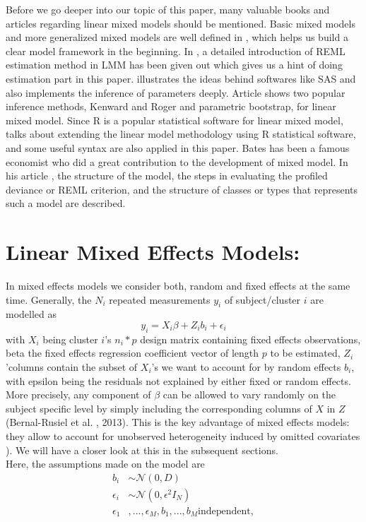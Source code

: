 \documentclass[a4paper,11pt]{article}
\begin{document}
	Before we go deeper into our topic of this paper, many valuable books and articles regarding linear mixed models should be mentioned. Basic mixed models and more generalized mixed models are well defined in \cite{Fahrmeir}, which helps us build a clear model framework in the beginning. In \cite{Tutorial}, a detailed introduction of REML estimation method in LMM has been given out which gives us a hint of doing estimation part in this paper. \cite{Verbeke} illustrates the ideas behind softwares like SAS and also implements the inference of parameters deeply. Article \cite{KR} shows two popular inference methods, Kenward and Roger and parametric bootstrap, for linear mixed model. Since R is a popular statistical software for linear mixed model, \cite{Faraway} talks about extending the linear model methodology using R statistical software, and some useful syntax are also applied in this paper. Bates has been a famous economist who did a great contribution to the development of mixed model. In his article \cite{Bates}, the structure of the model, the steps in evaluating the profiled deviance or REML criterion, and the structure of classes or types that represents such a model are described.
	
\section{Linear Mixed Effects Models:}

In mixed effects models we consider both, random and fixed effects at the same time. Generally, the 
$N_i$ repeated measurements  $y_i$ of subject/cluster $i$ are modelled as
\begin{equation}
	y_i=X_i\beta + Z_ib_i +\epsilon_i
\end{equation}
with $X_i$ being cluster $i$’s $n_i*p$  design matrix containing fixed effects observations, beta the fixed effects regression coefficient vector of length $p$ to be estimated, $Z_i$’columns contain the subset of $X_i$’s we want to account for by random effects $b_i$, with epsilon being the residuals not explained by either fixed or random effects. More precisely, any component of $\beta$ can be allowed to vary randomly on the subject specific level by simply including the corresponding columns of $X$ in $Z$ (Bernal-Rusiel et al. , 2013). This is the key advantage of mixed effects models: they allow to account for unobserved heterogeneity induced by omitted covariates \cite{Fahrmeir}).
 We will have a closer look at this in the subsequent sections.\\
Here, the assumptions made on the model are 
\begin{align*}
b_i &\sim \mathcal{N}(0,D)\\
\epsilon _i &\sim \mathcal{N}(0,\epsilon^2I_N)\\
\epsilon_1&,...,\epsilon_M,b_1,...,b_M   \text{independent},
\end{align*}
\end{document}
